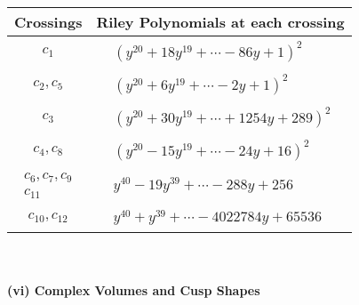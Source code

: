 \documentclass[1p]{elsarticle_modified}
\theoremstyle{definition}
\begin{document}
\begin{tabular}{m{50pt}|m{274pt}}
Crossings & \hspace{64pt}Riley Polynomials at each crossing \\
\hline $$\begin{aligned}c_{1}\end{aligned}$$&$\begin{aligned}
&(y^{20}+18 y^{19}+\cdots-86 y+1)^{2}
\end{aligned}$\\
\hline $$\begin{aligned}c_{2},c_{5}\end{aligned}$$&$\begin{aligned}
&(y^{20}+6 y^{19}+\cdots-2 y+1)^{2}
\end{aligned}$\\
\hline $$\begin{aligned}c_{3}\end{aligned}$$&$\begin{aligned}
&(y^{20}+30 y^{19}+\cdots+1254 y+289)^{2}
\end{aligned}$\\
\hline $$\begin{aligned}c_{4},c_{8}\end{aligned}$$&$\begin{aligned}
&(y^{20}-15 y^{19}+\cdots-24 y+16)^{2}
\end{aligned}$\\
\hline $$\begin{aligned}c_{6},c_{7},c_{9}\\c_{11}\end{aligned}$$&$\begin{aligned}
&y^{40}-19 y^{39}+\cdots-288 y+256
\end{aligned}$\\
\hline $$\begin{aligned}c_{10},c_{12}\end{aligned}$$&$\begin{aligned}
&y^{40}+y^{39}+\cdots-4022784 y+65536
\end{aligned}$\\
\hline
\end{tabular}\\~\\
\newpage\flushleft \textbf{(vi) Complex Volumes and Cusp Shapes}
\end{document}

